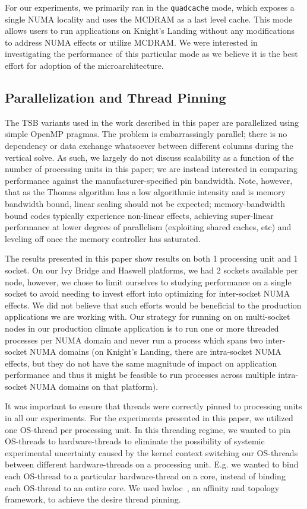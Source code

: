 \documentclass[conference]{IEEEtran}
\begin{document}
For our experiments, we primarily ran in the \lstinline{quadcache} mode, which
exposes a single NUMA locality and uses the MCDRAM as a last level cache. This
mode allows users to run applications on Knight's Landing without any
modifications to address NUMA effects or utilize MCDRAM. We were interested in
investigating the performance of this particular mode as we believe it is the
best effort for adoption of the microarchitecture.

\subsection{Parallelization and Thread Pinning}

The TSB variants used in the work described in this paper are parallelized
using simple OpenMP pragmas. The problem is embarrassingly parallel; there is
no dependency or data exchange whatsoever between different columns during the
vertical solve. As such, we largely do not discuss scalability as a function of
the number of processing units in this paper; we are instead interested in
comparing performance against the manufacturer-specified pin bandwidth. Note,
however, that as the Thomas algorithm has a low algorithmic intensity and is
memory bandwidth bound, linear scaling should not be expected; memory-bandwidth
bound codes typically experience non-linear effects, achieving super-linear
performance at lower degrees of parallelism (exploiting shared caches, etc) and
leveling off once the memory controller has saturated.

The results presented in this paper show results on both 1 processing unit and
1 socket. On our Ivy Bridge and Haswell platforms, we had 2 sockets available
per node, however, we chose to limit ourselves to studying performance on a
single socket to avoid needing to invest effort into optimizing for
inter-socket NUMA effects. We did not believe that such efforts would be
beneficial to the production applications we are working with. Our strategy for
running on on multi-socket nodes in our production climate application is to
run one or more threaded processes per NUMA domain and never run a process
which spans two inter-socket NUMA domains (on Knight's Landing, there are
intra-socket NUMA effects, but they do not have the same magnitude of impact on
application performance and thus it might be feasible to run processes across
multiple intra-socket NUMA domains on that platform). 

It was important to ensure that threads were correctly pinned to processing
units in all our experiments. For the experiments presented in this paper, we
utilized one OS-thread per processing unit. In this threading regime, we wanted
to pin OS-threads to hardware-threads to eliminate the possibility of systemic
experimental uncertainty caused by the kernel context switching our OS-threads
between different hardware-threads on a processing unit. E.g. we wanted to bind
each OS-thread to a particular hardware-thread on a core, instead of binding
each OS-thread to an entire core. We used hwloc~\cite{}, an affinity and
topology framework, to achieve the desire thread pinning.
\end{document}
